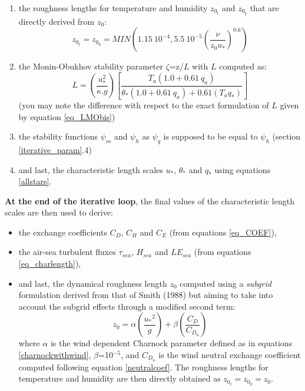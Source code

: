 \begin{enumerate}
	\item the roughness lengths for temperature and humidity $z_{0_{t}}$ and $z_{0_{q}}$ that are directly derived from $z_0$:
\begin{equation}
z_{0_{t}}=z_{0_{q}}=\mathit{MIN}\left(1.15~10^{-4},5.5~10^{-5}\left(\frac{\nu}{z_{0}u_{*}}\right)^{0.6}\right)
\end{equation}

	\item the Monin-Obukhov stability parameter $\zeta$=z/$L$ with $L$ computed as:
\begin{equation}
	L=\left(\frac{u_{*}^{2}}{\kappa.g}\right)\left[\frac{T_a(1.0+0.61~q_a)}{{\theta}_*(1.0+0.61~q_a)+0.61(T_a q_*)}\right]
\label{LMO_approx}\end{equation}
(you may note the difference with respect to the exact formulation of $L$ given by equation \ref{eq_LMObis})

	\item the stability functions $\psi_{m}$ and $\psi_{h}$ as $\psi_{q}$ is supposed to be equal to $\psi_{h}$ (section \ref{iterative_param}.4)

	\item and last, the characteristic length scales $u_*$, ${\theta}_*$ and $q_*$ using equations \ref{allstars}.

\end{enumerate}

\textbf{At the end of the iterative loop}, the final values of the characteristic length scales are then used to derive:

\begin{itemize}

	\item the exchange coefficients $C_D$, $C_H$ and $C_E$ (from equations \ref{eq_COEF}),

	\item the air-sea turbulent fluxes ${\tau}_{\mathit{sea}}$, $H_{\mathit{sea}}$ and ${\mathit{LE}}_{\mathit{sea}}$ 
	(from equations \ref{eq_charlength}),

	\item and last, the dynamical roughness length $z_0$ computed using a \textit{subgrid} formulation derived from that of Smith (1988) but 
		aiming to take into account the subgrid effects through a modified second term: 
\begin{equation}
	z_{0}=\alpha \left(\frac{{u_*}^{2}}{g}\right) + \beta \left(\frac{C_D}{C_{D_n}}\right)
\label{z0_arpege}
\end{equation}
where $\alpha$ is the wind dependent Charnock parameter defined as in equations \ref{charnockwithwind},
$\beta$=10$^{-5}$, and $C_{D_n}$ is the wind neutral exchange coefficient computed following equation \ref{neutralcoef}.
The roughness lengths for temperature and humidity are then directly obtained as $z_{0_t}=z_{0_q}=z_{0}$.

\end{itemize}


